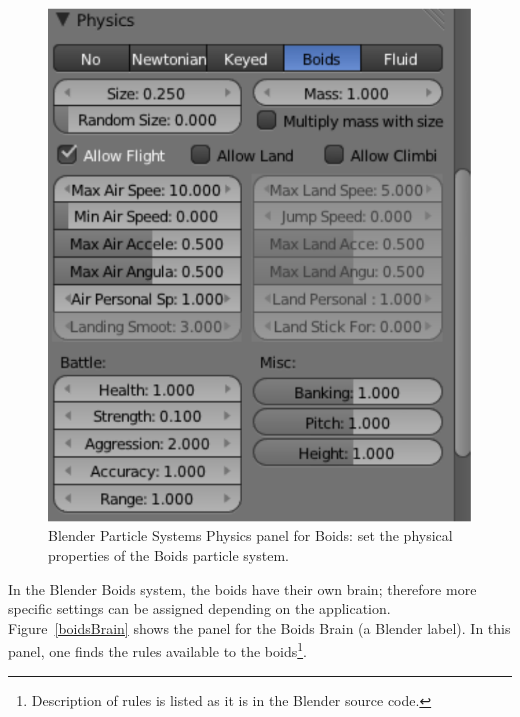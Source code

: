 \begin{figure}[htbp]
\begin{center}
\includegraphics[scale = 0.65]{figures/boidsPhysics.pdf} 
\caption{Blender Particle Systems Physics panel for Boids: set the physical properties of the Boids particle system.}
\label{boidsPhysics}
\end{center}
\end{figure}

In the Blender Boids system, the boids have their own brain; therefore more specific settings can be assigned depending on the application. Figure~\ref{boidsBrain} shows the panel for the Boids Brain (a Blender label). In this panel, one finds the rules available to the boids\footnote{Description of rules is listed as it is in the Blender source code.}.

